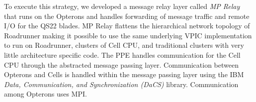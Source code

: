 \documentclass[10pt]{article}
\begin{document}





To execute this strategy, we developed a message relay layer called
\emph{MP Relay} that runs on the Opterons and handles forwarding of
message traffic and remote I/O for the QS22 blades.  
MP Relay flattens the hierarchical network
topology of Roadrunner making it possible to use the same underlying
VPIC implementation to run on Roadrunner, clusters of Cell CPU, and
traditional clusters with very little architecture specific code.  The
PPE handles communication for the Cell CPU through the abstracted
message passing layer.  Communication between Opterons and Cells is
handled within the message passing layer using the IBM \emph{Data,
Communication, and Synchronization (DaCS)} library. 
Communication among Opterons uses MPI.

\end{document}
